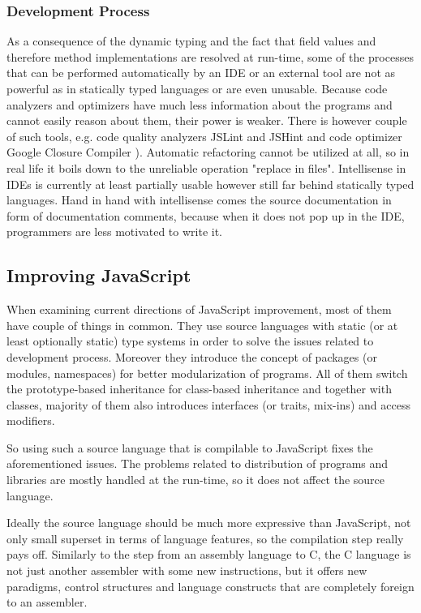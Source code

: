 \documentclass[12pt,a4paper]{report}
\begin{document}
\subsubsection*{Development Process} 

As a consequence of the dynamic typing and the fact that field values and therefore method implementations are resolved at run-time, some of the processes that can be performed automatically by an IDE or an external tool are not as powerful as in statically typed languages or are even unusable. Because code analyzers and optimizers have much less information about the programs and cannot easily reason about them, their power is weaker. There is however couple of such tools, e.g. code quality analyzers JSLint \cite{JsLint} and JSHint \cite{JsHint} and code optimizer Google Closure Compiler \cite{GoogleClosure}). Automatic refactoring cannot be utilized at all, so in real life it boils down to the unreliable operation "replace in files". Intellisense in IDEs is currently at least partially usable however still far behind statically typed languages. Hand in hand with intellisense comes the source documentation in form of documentation comments, because when it does not pop up in the IDE, programmers are less motivated to write it.

\subsection{Improving JavaScript}

When examining current directions of JavaScript improvement, most of them have couple of things in common. They use source languages with static (or at least optionally static) type systems in order to solve the issues related to development process. Moreover they introduce the concept of packages (or modules, namespaces) for better modularization of programs. All of them switch the prototype-based inheritance for class-based inheritance and together with classes, majority of them also introduces interfaces (or traits, mix-ins) and access modifiers.

So using such a source language that is compilable to JavaScript fixes the aforementioned issues. The problems related to distribution of programs and libraries are mostly handled at the run-time, so it does not affect the source language.

Ideally the source language should be much more expressive than JavaScript, not only small superset in terms of language features, so the compilation step really pays off. Similarly to the step from an assembly language to C, the C language is not just another assembler with some new instructions, but it offers new paradigms, control structures and language constructs that are completely foreign to an assembler.
\end{document}
